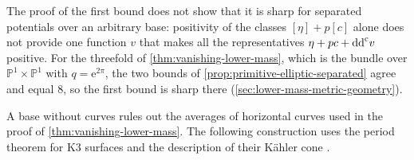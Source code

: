 The proof of the first bound does not show that it is sharp for separated potentials over an arbitrary base: positivity of the classes $[\eta]+p[c]$ alone does not provide one function $v$ that makes all the representatives $\eta+pc+\mathrm{dd}^{\mathrm{c}} v$ positive. For the threefold of \cref{thm:vanishing-lower-mass}, which is the bundle over $\mathbb P^1\times\mathbb P^1$ with $q=\mathrm e^{2\pi}$, the two bounds of \cref{prop:primitive-elliptic-separated} agree and equal $8$, so the first bound is sharp there (\cref{sec:lower-mass-metric-geometry}).

A base without curves rules out the averages of horizontal curves used in the proof of \cref{thm:vanishing-lower-mass}. The following construction uses the period theorem for K3 surfaces and the description of their K\"ahler cone \cite[Theorems 7.4.1 and 8.5.2 of the online version]{HuyK3}.

